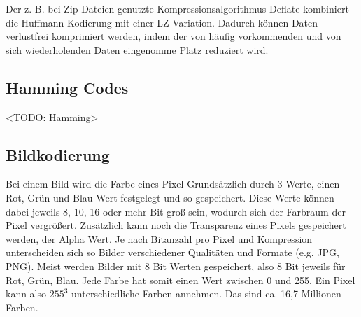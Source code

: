Der z. B. bei Zip-Dateien genutzte Kompressionsalgorithmus Deflate kombiniert
die Huffmann-Kodierung mit einer LZ-Variation. Dadurch können Daten verlustfrei
komprimiert werden, indem der von häufig vorkommenden und von sich wiederholenden
Daten eingenomme Platz reduziert wird. 

\subsection{Hamming Codes}

<TODO: Hamming>

\subsection{Bildkodierung}

Bei einem Bild wird die Farbe eines Pixel Grundsätzlich durch 3 Werte, einen Rot,
Grün und Blau Wert festgelegt und so gespeichert. Diese Werte können dabei jeweils
8, 10, 16 oder mehr Bit groß sein, wodurch sich der Farbraum der Pixel vergrößert.
Zusätzlich kann noch die Transparenz eines Pixels gespeichert werden, der Alpha Wert.
Je nach Bitanzahl pro Pixel und Kompression unterscheiden sich so Bilder verschiedener
Qualitäten und Formate (e.g. JPG, PNG). Meist werden Bilder mit 8 Bit Werten gespeichert,
also 8 Bit jeweils für Rot, Grün, Blau. Jede Farbe hat somit einen Wert zwischen 0 und 255.
Ein Pixel kann also $255^3$ unterschiedliche Farben annehmen. Das sind ca. 16,7 Millionen
Farben.
